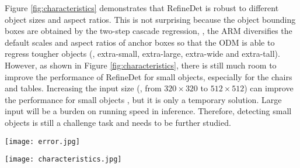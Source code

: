\documentclass[10pt,twocolumn,letterpaper]{article}
\begin{document}
Figure \ref{fig:characteristics} demonstrates that RefineDet is robust to different object sizes and aspect ratios. This is not surprising because the object bounding boxes are obtained by the two-step cascade regression, \ie, the ARM diversifies the default scales and aspect ratios of anchor boxes so that the ODM is able to regress tougher objects (\eg, extra-small, extra-large, extra-wide and extra-tall). However, as shown in Figure \ref{fig:characteristics}, there is still much room to improve the performance of RefineDet for small objects, especially for the chairs and tables. Increasing the input size (\eg, from $320\times320$ to $512\times512$) can improve the performance for small objects , but it is only a temporary solution. Large input will be a burden on running speed in inference. Therefore, detecting small objects is still a challenge task and needs to be further studied.

\begin{figure*}
\centering
\texttt{[image: error.jpg]}
\vspace{-2mm}
\caption{Visualization of the performance of RefineDet512 on animals, vehicles, and furniture classes in the VOC 2007 {\tt test} set. The top row shows the cumulative fraction of detections that are correct (Cor) or false positive due to poor localization (Loc), confusion with similar categories (Sim), with others (Oth), or with background (BG). The solid red line reflects the change of recall with strong criteria ($0.5$ jaccard overlap) as the number of detections increases. The dashed red line is using the ``weak'' criteria ($0.1$ jaccard overlap). The bottom row shows the distribution of the top-ranked false positive types.}
\label{fig:error}
\end{figure*}

\begin{figure*}
\centering
\texttt{[image: characteristics.jpg]}
\caption{Sensitivity and impact of different object characteristics on the VOC 2007 {\tt test} set. The plot on the left shows the effects of BBox Area per category, and the right plot shows the effect of Aspect Ratio. Key: BBox Area: XS=extra-small; S=small; M=medium; L=large; XL =extra-large. Aspect Ratio: XT=extra-tall/narrow; T=tall; M=medium; W=wide; XW =extra-wide.}
\label{fig:characteristics}
\end{figure*}
\end{document}
